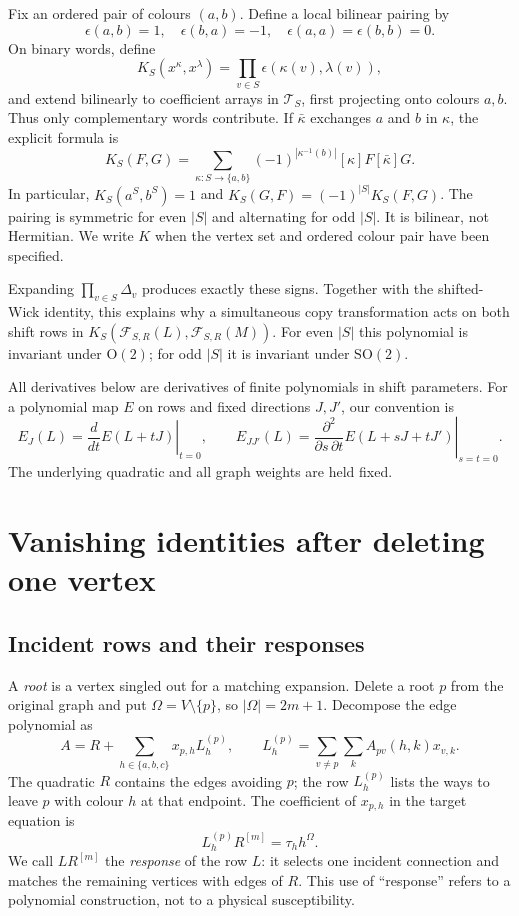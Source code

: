 \documentclass[11pt]{article}
\theoremstyle{definition}
\theoremstyle{plain}
\numberwithin{equation}{section}
\begin{document}
Fix an ordered pair of colours \((a,b)\). Define a local bilinear pairing
by
\[
 \epsilon(a,b)=1,\quad \epsilon(b,a)=-1,\quad
 \epsilon(a,a)=\epsilon(b,b)=0.
\]
On binary words, define
\[
 K_S(x^\kappa,x^\lambda)
   =\prod_{v\in S}\epsilon(\kappa(v),\lambda(v)),
\]
and extend bilinearly to coefficient arrays in \(\mathcal T_S\), first
projecting onto colours \(a,b\). Thus only complementary words contribute.
If \(\bar\kappa\) exchanges \(a\) and \(b\) in \(\kappa\), the
explicit formula is
\[
 K_S(F,G)=\sum_{\kappa:S\to\{a,b\}}
    (-1)^{|\kappa^{-1}(b)|}[\kappa]F[\bar\kappa]G.
\]
In particular, \(K_S(a^S,b^S)=1\) and
\(K_S(G,F)=(-1)^{|S|}K_S(F,G)\). The pairing is symmetric for even
\(|S|\) and alternating for odd \(|S|\). It is bilinear, not Hermitian.
We write \(K\) when the vertex set and ordered colour pair have been specified.

Expanding \(\prod_{v\in S}\Delta_v\) produces exactly these signs.
Together with the shifted-Wick identity, this explains why a simultaneous
copy transformation acts on both shift rows in
\(K_S(\mathcal F_{S,R}(L),\mathcal F_{S,R}(M))\). For even \(|S|\)
this polynomial is invariant under \(\mathrm O(2)\); for odd
\(|S|\) it is invariant under \(\mathrm{SO}(2)\).

All derivatives below are derivatives of finite polynomials in shift
parameters. For a polynomial map \(E\) on rows and fixed directions
\(J,J'\), our convention is
\[
 E_J(L)=\left.\frac{d}{dt}E(L+tJ)\right|_{t=0},\qquad
 E_{JJ'}(L)=\left.\frac{\partial^2}{\partial s\,\partial t}
       E(L+sJ+tJ')\right|_{s=t=0}.
\]
The underlying quadratic and all graph weights are held fixed.

\section{Vanishing identities after deleting one vertex}\label{sec:higher}

\subsection{Incident rows and their responses}\label{sec:rootrows}

A \emph{root} is a vertex singled out for a matching expansion. Delete a
root \(p\) from the original graph and put \(\Omega=V\setminus\{p\}\),
so \(|\Omega|=2m+1\). Decompose the edge polynomial as
\[
 A=R+\sum_{h\in\{a,b,c\}}x_{p,h}L_h^{(p)},\qquad
 L_h^{(p)}=\sum_{v\ne p}\sum_k A_{pv}(h,k)x_{v,k}.
\]
The quadratic \(R\) contains the edges avoiding \(p\); the row
\(L_h^{(p)}\) lists the ways to leave \(p\) with colour \(h\) at that
endpoint. The coefficient of \(x_{p,h}\) in the target equation is
\[
 L_h^{(p)}R^{[m]}=\tau_hh^\Omega.
\]
We call \(LR^{[m]}\) the \emph{response} of the row \(L\): it selects
one incident connection and matches the remaining vertices with edges of
\(R\). This use of ``response'' refers to a polynomial construction, not
to a physical susceptibility.
\end{document}
